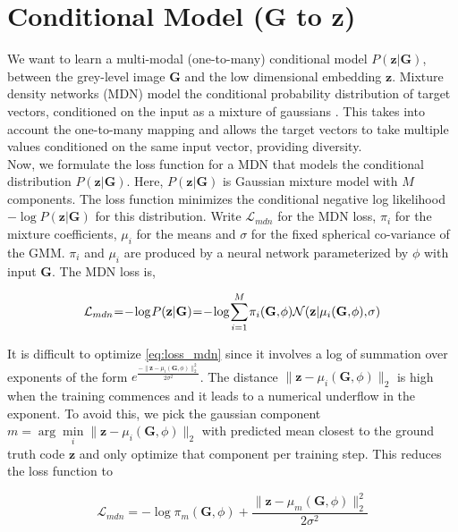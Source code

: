\documentclass[10pt,twocolumn,letterpaper]{article}
\begin{document}
\section{Conditional Model (G to z)}\label{sec:mdn}We want to learn a multi-modal (one-to-many) conditional model $P(\mathbf{z}|\mathbf{G})$, 
between the grey-level image $\mathbf{G}$ and the low dimensional embedding $\mathbf{z}$.
Mixture density networks (MDN) model the conditional probability distribution of 
target vectors, conditioned on the input as a mixture of gaussians \cite{BishopMDN}.
This takes into account the one-to-many mapping and allows the target vectors to take 
multiple values conditioned on the same input vector, providing diversity. \\ 

Now, we formulate the loss function for a MDN that models the conditional 
distribution $P(\mathbf{z}|\mathbf{G})$. Here, $P(\mathbf{z}|\mathbf{G})$ is 
Gaussian mixture model with $M$ components. The loss function minimizes the 
conditional negative log likelihood $-\log P(\mathbf{z}|\mathbf{G})$ for
this distribution. Write $\mathcal{L}_{mdn}$ for the MDN loss, $\pi_i$ for the 
mixture coefficients, $\mu_{i}$ for the means and $\sigma$ for the fixed 
spherical co-variance of the GMM. $\pi_i$ and $\mu_i$ are produced 
by a neural network parameterized by $\phi$ with input $\mathbf{G}$. The
MDN loss is, 

\begin{equation}
\label{eq:loss_mdn}
\medmuskip=1mu
\thinmuskip=1mu
\thickmuskip=1mu
\mathcal{L}_{mdn} = - \log P(\mathbf{z} | \mathbf{G}) = - \log \sum\limits_{i=1}^{M} 
\pi_{i}(\mathbf{G}, \phi) \mathcal{N}(\mathbf{z} | \mu_i(\mathbf{G}, \phi), \sigma)  
\end{equation}

It is difficult to optimize \autoref{eq:loss_mdn} since it involves a log of 
summation over exponents of the form 
$e^{\frac{-\|\mathbf{z}-\mu_i(\mathbf{G}, \phi)\|^{2}_{2}}{2\sigma^{2}}}$. The
distance $\| \mathbf{z} - \mu_i(\mathbf{G}, \phi) \|_{2}$ is high when the 
training commences and it leads to a numerical underflow in the exponent.
To avoid this, we pick the gaussian component $m = \arg\min\limits_{i} 
\| \mathbf{z} - \mu_i(\mathbf{G}, \phi) \|_{2}$ with predicted mean closest
to the ground truth code $\mathbf{z}$ and only optimize that component per 
training step. This reduces the loss function to

\begin{equation}
\label{eq:loss_mdn}
\mathcal{L}_{mdn} = - \log \pi_{m}(\mathbf{G}, \phi) + \frac{\|\mathbf{z}-\mu_m(\mathbf{G}, \phi)\|^{2}_{2}}{2\sigma^{2}}
\end{equation}
\end{document}
